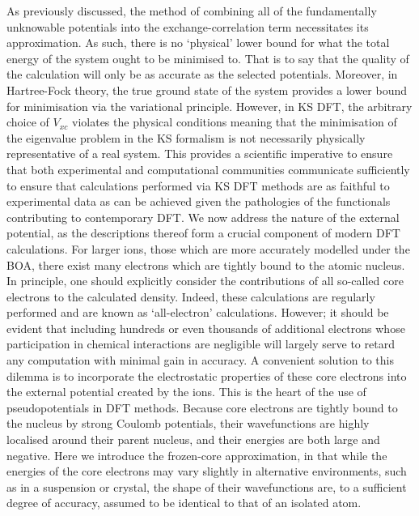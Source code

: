 As previously discussed, the method of combining all of the fundamentally unknowable potentials into the exchange-correlation term necessitates its approximation. As such, there is no `physical' lower bound for what the total energy of the system ought to be minimised to. That is to say that the quality of the calculation will only be as accurate as the selected potentials. Moreover, in Hartree-Fock theory, the true ground state of the system provides a lower bound for minimisation via the variational principle. However, in KS DFT, the arbitrary choice of $V_{xc}$ violates the physical conditions meaning that the minimisation of the eigenvalue problem in the KS formalism is not necessarily physically representative of a real system. This provides a scientific imperative to ensure that both experimental and computational communities communicate sufficiently to ensure that calculations performed via KS DFT methods are as faithful to experimental data as can be achieved given the pathologies of the functionals contributing to contemporary DFT.
We now address the nature of the external potential, as the descriptions thereof form a crucial component of modern DFT calculations. For larger ions, those which are more accurately modelled under the BOA, there exist many electrons which are tightly bound to the atomic nucleus. In principle, one should explicitly consider the contributions of all so-called core electrons to the calculated density. Indeed, these calculations are regularly performed and are known as `all-electron' calculations. However; it should be evident that including hundreds or even thousands of additional electrons whose participation in chemical interactions are negligible will largely serve to retard any computation with minimal gain in accuracy. A convenient solution to this dilemma is to incorporate the electrostatic properties of these core electrons into the external potential created by the ions. This is the heart of the use of pseudopotentials in DFT methods. Because core electrons are tightly bound to the nucleus by strong Coulomb potentials, their wavefunctions are highly localised around their parent nucleus, and their energies are both large and negative. Here we introduce the frozen-core approximation, in that while the energies of the core electrons may vary slightly in alternative environments, such as in a suspension or crystal, the shape of their wavefunctions are, to a sufficient degree of accuracy, assumed to be identical to that of an isolated atom. 

